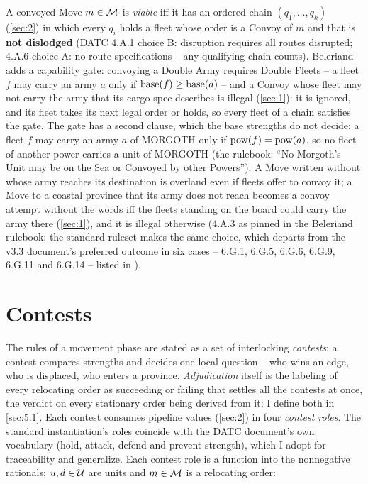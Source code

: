 \documentclass[12pt,a4paper]{article}
\begin{document}
A convoyed Move $m \in \mathcal{M}$ is \emph{viable} iff it has an ordered chain $(q_1, \dots, q_k)$ (\cref{sec:2}) in which every $q_i$ holds a fleet whose order is a Convoy of $m$ and that is \textbf{not dislodged} (DATC 4.A.1 choice B: disruption requires all routes disrupted; 4.A.6 choice A: no route specifications -- any qualifying chain counts).
Beleriand adds a capability gate: convoying a Double Army requires Double Fleets -- a fleet $f$ may carry an army $a$ only if $\operatorname{base}(f) \ge \operatorname{base}(a)$ -- and a Convoy whose fleet may not carry the army that its cargo spec describes is illegal (\cref{sec:1}): it is ignored, and its fleet takes its next legal order or holds, so every fleet of a chain satisfies the gate.
The gate has a second clause, which the base strengths do not decide: a fleet $f$ may carry an army $a$ of MORGOTH only if $\operatorname{pow}(f) = \operatorname{pow}(a)$, so no fleet of another power carries a unit of MORGOTH (the rulebook: ``No Morgoth's Unit may be on the Sea or Convoyed by other Powers'').
A Move written without  whose army reaches its destination is overland even if fleets offer to convoy it; a Move to a coastal province that its army does not reach becomes a convoy attempt without the words iff the fleets standing on the board could carry the army there (\cref{sec:1}), and it is illegal otherwise (4.A.3 as pinned in the Beleriand rulebook; the standard ruleset makes the same choice, which departs from the v3.3 document's preferred outcome in six cases -- 6.G.1, 6.G.5, 6.G.6, 6.G.9, 6.G.11 and 6.G.14 -- listed in ).

\section{Contests}\label{sec:4}

The rules of a movement phase are stated as a set of interlocking \emph{contests}: a contest compares strengths and decides one local question -- who wins an edge, who is displaced, who enters a province.
\emph{Adjudication} itself is the labeling of every relocating order as succeeding or failing that settles all the contests at once, the verdict on every stationary order being derived from it; I define both in \cref{sec:5.1}.
Each contest consumes pipeline values (\cref{sec:2}) in four \emph{contest roles}.
The standard instantiation's roles coincide with the DATC document's own vocabulary (hold, attack, defend and prevent strength), which I adopt for traceability and generalize.
Each contest role is a function into the nonnegative rationals; $u, d \in \mathcal{U}$ are units and $m \in \mathcal{M}$ is a relocating order:
\end{document}
